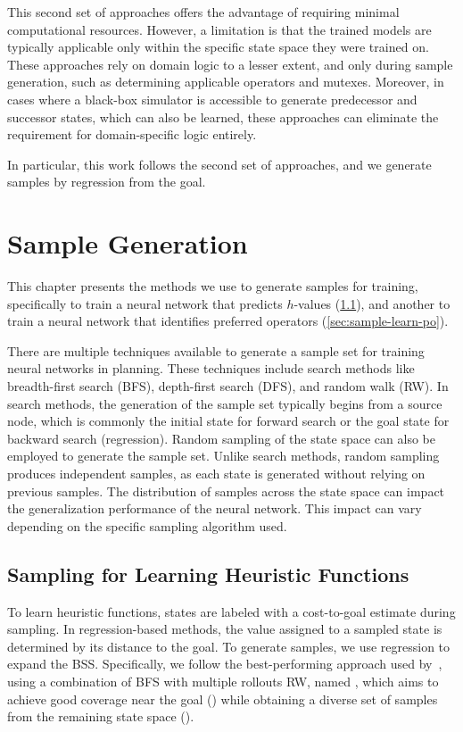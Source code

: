\documentclass[ppgc,diss,english]{iiufrgs}
\begin{document}
This second set of approaches offers the advantage of requiring minimal computational resources. However, a limitation is that the trained models are typically applicable only within the specific state space they were trained on. These approaches rely on domain logic to a lesser extent, and only during sample generation, such as determining applicable operators and mutexes. Moreover, in cases where a black-box simulator is accessible to generate predecessor and successor states, which can also be learned, these approaches can eliminate the requirement for domain-specific logic entirely.

In particular, this work follows the second set of approaches, and we generate samples by regression from the goal.


%
%
\chapter{Sample Generation}
\label{cha:sample-gen}
This chapter presents the methods we use to generate samples for training, specifically to train a neural network that predicts $h$-values (\cref{sec:sample-learn-h}), and another to train a neural network that identifies preferred operators (\cref{sec:sample-learn-po}).

There are multiple techniques available to generate a sample set for training neural networks in planning. These techniques include search methods like breadth-first search (BFS), depth-first search (DFS), and random walk (RW). In search methods, the generation of the sample set typically begins from a source node, which is commonly the initial state for forward search or the goal state for backward search (regression). Random sampling of the state space can also be employed to generate the sample set. Unlike search methods, random sampling produces independent samples, as each state is generated without relying on previous samples. The distribution of samples across the state space can impact the generalization performance of the neural network. This impact can vary depending on the specific sampling algorithm used.

\section{Sampling for Learning Heuristic Functions}
\label{sec:sample-learn-h}
To learn heuristic functions, states are labeled with a cost-to-goal estimate during sampling. In regression-based methods, the value assigned to a sampled state is determined by its distance to the goal. To generate samples, we use regression to expand the BSS. Specifically, we follow the best-performing approach used by~\citet{Bettker.etal/2022}, using a combination of BFS with multiple rollouts RW, named \bfsrw, which aims to achieve good coverage near the goal (\bfs) while obtaining a diverse set of samples from the remaining state space (\rw).
\end{document}
